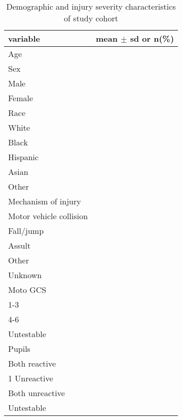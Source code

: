 \documentclass{article}
\begin{document}
\begin{table}[H]
\caption{Demographic and injury severity characteristics of study cohort}
\begin{center}
\begin{tabular}{lc}
\hline
variable & mean $\pm$ sd or n(\%)\\
\hline
Age & \\
Sex &\\
\hspace{1 em} Male &\\
\hspace{1 em} Female &\\
Race &\\
\hspace{1 em} White &\\
\hspace{1 em} Black &\\
\hspace{1 em} Hispanic &\\
\hspace{1 em} Asian &\\
\hspace{1 em} Other &\\
Mechanism of injury &\\
\hspace{1 em} Motor vehicle collision &\\
\hspace{1 em} Fall/jump &\\
\hspace{1 em} Assult &\\
\hspace{1 em} Other &\\
\hspace{1 em} Unknown &\\
Moto GCS & \\
\hspace{1 em} 1-3 &\\
\hspace{1 em} 4-6 & \\
\hspace{1 em} Untestable\\
Pupils & \\
\hspace{1 em} Both reactive &\\
\hspace{1 em} 1 Unreactive & \\
\hspace{1 em} Both unreactive\\
\hspace{1 em} Untestable\\

\end{tabular}
\end{center}
\end{table}
\end{document}
